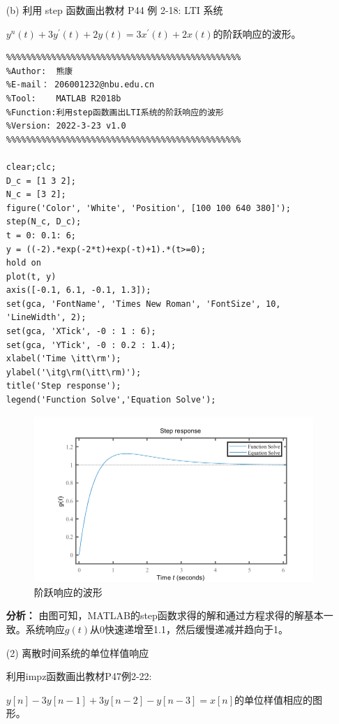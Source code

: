 \documentclass[UTF8,AutoFakeBold]{ctexart}
\begin{document}
\begin{enumerate}
\begin{enumerate}
			\item[(b)] 利用 step 函数画出教材 P44 例 2-18: LTI 系统\par
				$y^{n} (t)+3y^{'} (t)+2y(t)=3x^{'}(t)+2x(t)$的阶跃响应的波形。
				\begin{lstlisting}
%%%%%%%%%%%%%%%%%%%%%%%%%%%%%%%%%%%%%%%%%%%%%%% 
%Author:  熊康
%E-mail： 206001232@nbu.edu.cn
%Tool:    MATLAB R2018b
%Function:利用step函数画出LTI系统的阶跃响应的波形
%Version: 2022-3-23 v1.0
%%%%%%%%%%%%%%%%%%%%%%%%%%%%%%%%%%%%%%%%%%%%%%%

clear;clc;
D_c = [1 3 2];
N_c = [3 2];
figure('Color', 'White', 'Position', [100 100 640 380]');
step(N_c, D_c);
t = 0: 0.1: 6;
y = ((-2).*exp(-2*t)+exp(-t)+1).*(t>=0);
hold on 
plot(t, y)
axis([-0.1, 6.1, -0.1, 1.3]);
set(gca, 'FontName', 'Times New Roman', 'FontSize', 10, 'LineWidth', 2);
set(gca, 'XTick', -0 : 1 : 6);
set(gca, 'YTick', -0 : 0.2 : 1.4);
xlabel('Time \itt\rm');
ylabel('\itg\rm(\itt\rm)');
title('Step response');
legend('Function Solve','Equation Solve');
				\end{lstlisting}
				\begin{figure}[H]
					\centering
					\includegraphics[scale=0.6]{./figures/photo4.png}
					\caption{阶跃响应的波形}
				\end{figure}
			
				\textbf{\songti 分析：} 由图可知，MATLAB的step函数求得的解和通过方程求得的解基本一致。系统响应$g(t)$从0快速递增至1.1，然后缓慢递减并趋向于1。 
		\end{enumerate}

		
		\begin{enumerate}
			\item[(2)] 离散时间系统的单位样值响应\par
			利用impz函数画出教材P47例2-22:\par
			$y[n]-3y[n-1]+3y[n-2]-y[n-3]=x[n]$的单位样值相应的图形。
		

\end{enumerate}
\end{enumerate}
\end{document}
